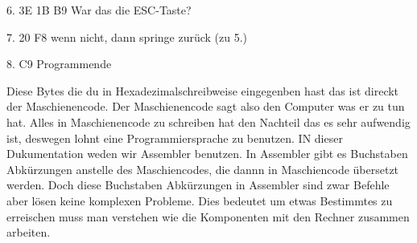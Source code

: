\documentclass[10pt]{book}
\begin{document}
6. 3E 1B B9		War das die ESC-Taste?

7. 20 F8		wenn nicht, dann springe zurück (zu 5.)

8. C9			Programmende


Diese Bytes die du in Hexadezimalschreibweise eingegenben hast das ist direckt der Maschienencode. Der Maschienencode sagt also den Computer was er zu tun hat.
Alles in Maschienencode zu schreiben hat den Nachteil das es sehr aufwendig ist, deswegen lohnt eine Programmiersprache zu benutzen. IN dieser Dukumentation weden wir Assembler benutzen.
In Assembler gibt es Buchstaben Abkürzungen anstelle des Maschiencodes, die dannn in Maschiencode übersetzt werden. Doch diese Buchstaben Abkürzungen in Assembler sind zwar Befehle aber lösen keine komplexen Probleme. Dies bedeutet um etwas Bestimmtes zu erreischen muss man verstehen wie die Komponenten mit den Rechner zusammen arbeiten.
\end{document}
